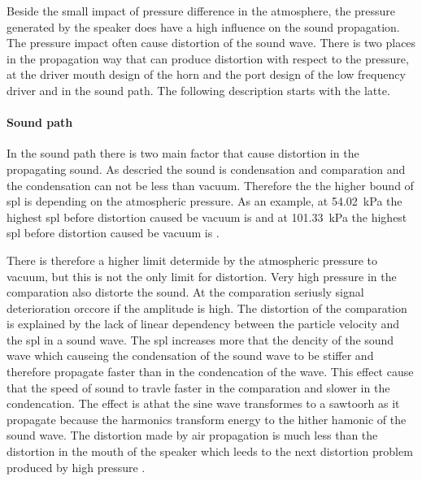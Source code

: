 Beside the small impact of pressure difference in the atmosphere, the pressure generated by the speaker does have a high influence on the sound propagation. The pressure impact often cause distortion of the sound wave. There is two places in the propagation way that can produce distortion with respect to the pressure, at the driver mouth design of the horn \citep{czerwinski1999air} and the port design of the low frequency driver \citep{vanderkooy1998nonlinearities} and in the sound path. The following description starts with the latte.

\paragraph{Sound path} In the sound path there is two main factor that cause distortion in the propagating sound. As descried the sound is condensation and comparation and the condensation can not be less than vacuum. Therefore the the higher bound of \gls{spl} is depending on the atmospheric pressure. As an example, at \SI{54.02}{\kilo\pascal} the highest \gls{spl} before distortion caused be vacuum is  and at \SI{101.33}{\kilo\pascal} the highest \gls{spl} before distortion caused be vacuum is . 

There is therefore a higher limit determide by the atmospheric pressure to vacuum, but this is not the only limit for distortion. Very high pressure in the comparation also distorte the sound. At the comparation seriusly signal deterioration orccore if the amplitude is high. The distortion of the comparation is explained by the lack of linear dependency between the particle velocity and the \gls{spl} in a sound wave. The \gls{spl} increases more that the dencity of the sound wave which causeing the condensation of the sound wave to be stiffer and therefore propagate faster than in the condencation of the wave. This effect cause that the speed of sound to travle faster in the comparation and slower in the condencation. The effect is athat the sine wave transformes to a sawtoorh as it propagate because the harmonics transform energy to the hither hamonic of the sound wave. The distortion made by air propagation is much less than the distortion in the mouth of the speaker which leeds to the next distortion  problem produced by high pressure \citep{czerwinski1999air}.

